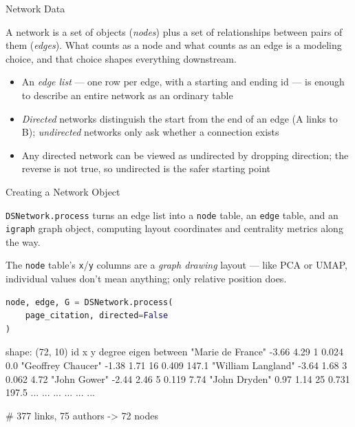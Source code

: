 \documentclass[8pt,aspectratio=169]{beamer}
\begin{document}
\begin{textframe}{Network Data}

A network is a set of objects (\textit{nodes}) plus a set of relationships between pairs of them (\textit{edges}). What counts as a node and what counts as an edge is a modeling choice, and that choice shapes everything downstream.

\begin{itemize}
\item An \textit{edge list} --- one row per edge, with a starting and ending id --- is enough to describe an entire network as an ordinary table
\item \textit{Directed} networks distinguish the start from the end of an edge (A links to B); \textit{undirected} networks only ask whether a connection exists
\item Any directed network can be viewed as undirected by dropping direction; the reverse is not true, so undirected is the safer starting point
\end{itemize}

\end{textframe}

\begin{frame}[fragile]{Creating a Network Object}
\begin{splitcode}{%

\texttt{DSNetwork.process} turns an edge list into a \texttt{node} table, an \texttt{edge} table, and an \texttt{igraph} graph object, computing layout coordinates and centrality metrics along the way.

The \texttt{node} table's \texttt{x}/\texttt{y} columns are a \textit{graph drawing} layout --- like PCA or UMAP, individual values don't mean anything; only relative position does.

}
\begin{lstlisting}[language=Python]
node, edge, G = DSNetwork.process(
    page_citation, directed=False
)
\end{lstlisting}
\begin{codeoutput}
shape: (72, 10)
id                  x      y     degree  eigen  between
"Marie de France"   -3.66  4.29  1       0.024  0.0
"Geoffrey Chaucer"  -1.38  1.71  16      0.409  147.1
"William Langland"  -3.64  1.68  3       0.062  4.72
"John Gower"        -2.44  2.46  5       0.119  7.74
"John Dryden"       0.97   1.14  25      0.731  197.5
...                 ...    ...   ...     ...    ...

# 377 links, 75 authors -> 72 nodes
\end{codeoutput}
\end{splitcode}
\end{frame}
\end{document}
